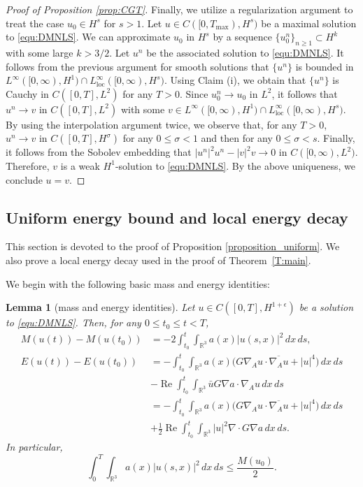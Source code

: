 \documentclass[10pt%
]{amsart}
\numberwithin{equation}{section}
\newcommand{\R}{\mathbb{R}}
\newtheorem{lemma}[theorem]{Lemma}
\theoremstyle{definition}
\begin{document}
\begin{proof}[Proof of Proposition \ref{prop:CGT}]
	Finally, we utilize a regularization argument to treat the case $u_0\in H^s$ for $s>1$. Let $u\in C([0,T_{\mathrm{max}}),H^s)$ be a maximal solution to \eqref{equ:DMNLS}. We can approximate $u_0$ in $H^s$ by a sequence  $\{u_0^n\}_{n\ge1}\subset H^k$ with some large $k>3/2$. Let $u^n$ be the associated solution to \eqref{equ:DMNLS}. It follows from the previous argument for smooth solutions that $\{u^n\}$ is bounded in $L^\infty([0,\infty), H^1) \cap L_{\mathrm{loc}}^\infty([0,\infty), H^s)$. Using Claim (i), we obtain that $\{u^n\}$ is Cauchy in $C([0,T],L^2)$ for any $T>0$. Since $u^{n}_{0} \to u_0$ in $L^{2}$, it follows that $u^n\to v$ in $C([0,T], L^{2})$ with some $v\in L^\infty([0,\infty), H^1) \cap L_{\mathrm{loc}}^\infty([0,\infty), H^s)$. By using the interpolation argument twice, we observe that, for any $T>0$, $u^n\to v$ in $C([0,T], H^\sigma)$ for any $0\le \sigma<1$ and then for any $0\le \sigma<s$. Finally, it follows from the Sobolev embedding that $|u^n|^2u^n-|v|^2v\to 0$ in $C([0,\infty),L^2)$. Therefore, $v$ is a weak $H^1$-solution to \eqref{equ:DMNLS}. By the above uniqueness, we conclude $u=v$.
\end{proof}

\subsection{Uniform energy bound and local energy decay}\label{subsec:UnienerLoc}
\label{section_local_energy_decay}	
This section is devoted to the proof of Proposition \ref{proposition_uniform}. We also prove a local energy decay used in the proof of Theorem~\ref{T:main}. 

We begin with the following basic mass and energy identities: 
\begin{lemma}[mass and energy identities]\label{lem:maenerg}
	Let $u\in C([0,T], H^{1+\epsilon})$ be a solution to \eqref{equ:DMNLS}. Then, for any $0\leq t_0\leq t<T$, 
	\begin{align}\label{equ:mass}
		M(u(t))-M(u(t_0))&=-2\int_{t_0}^t\int_{\R^3}a(x)|u(s,x)|^2\,dx\,ds,\\
		\label{equ:energy}
		E(u(t))-E(u(t_0))&
		=-\int_{t_0}^t\int_{\R^3}a(x)\big(G\nabla_A u\cdot \overline{\nabla_Au}+|u|^{4}\big)\,dx\,ds\\\nonumber
		&-\mathop{\mathrm{Re}} \int_{t_0}^t\int_{\R^3}\bar{u} G\nabla a\cdot\nabla_Au\,dx\,ds\\\nonumber
		&=-\int_{t_0}^t\int_{\R^3}a(x)\big(G\nabla_A u\cdot \overline{\nabla_Au}+|u|^{4}\big)\,dx\,ds\\\nonumber
		&+\frac12\mathop{\mathrm{Re}} \int_{t_0}^t\int_{\R^3}|u|^2\nabla\cdot G\nabla a\,dx\,ds.
	\end{align}
	In particular,
	\begin{equation}\label{equ:axmasscon}
		\int_0^{T}\int_{\R^3}a(x)|u(s,x)|^2\,dx\,ds\leq\frac{M(u_0)}2.
	\end{equation}
	
\end{lemma}
\end{document}
